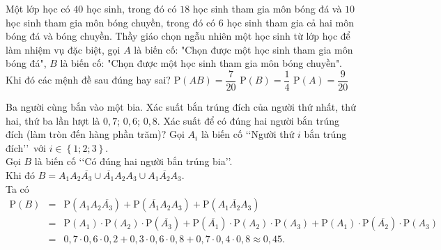 \begin{ex}%
	Một lớp học có $40$ học sinh, trong đó có $18$ học sinh tham gia môn bóng đá và $10$ học sinh tham gia môn bóng chuyền, trong đó có $6$ học sinh tham gia cả hai môn bóng đá và bóng chuyền. Thầy giáo chọn ngẫu nhiên một học sinh từ lớp học để làm nhiệm vụ đặc biệt, gọi $A$ là biến cố: "Chọn được một học sinh tham gia môn bóng đá", $B$ là biến cố: "Chọn được một học sinh tham gia môn bóng chuyền". Khi đó các mệnh đề sau đúng hay sai?
	{$\mathrm{P}(AB)=\dfrac{7}{20}$}
	{\True $\mathrm{P}(B)=\dfrac{1}{4}$}
	{\True $\mathrm{P}(A)=\dfrac{9}{20}$}
\end{ex}

\begin{ex}%
Ba người cùng bắn vào một bia. Xác suất bắn trúng đích của người thứ nhất, thứ hai, thứ ba lần lượt là $0,7$; $0,6$; $0,8$. Xác suất để có đúng hai người bắn trúng đích (làm tròn đến hàng phần trăm)?
\loigiai
{
Gọi $A_i$ là biến cố \lq\lq Người thứ $i$ bắn trúng đích\rq\rq\, với $i \in \left\{1;2;3\right\}$.\\
Gọi $B$ là biến cố \lq\lq Có đúng hai người bắn trúng bia\rq\rq.\\
Khi đó $B=A_1A_2\overline{A_3}\cup \overline{A_1}A_2A_3\cup A_1\overline{A_2}A_3$.\\
Ta có 
\begin{eqnarray*}
\mathrm{P} \left(B \right) &=& \mathrm{P} \left(A_1A_2\overline{A_3} \right)+\mathrm{P} \left(\overline{A_1}A_2A_3 \right)+\mathrm{P} \left(A_1\overline{A_2}A_3 \right) \\ 
& = & \mathrm{P} \left(A_1 \right) \cdot \mathrm{P} \left(A_2 \right)\cdot \mathrm{P} \left(\overline{A_3} \right)+\mathrm{P} \left(\overline{A_1} \right)\cdot \mathrm{P} \left(A_2 \right)\cdot \mathrm{P} \left(A_3 \right)+\mathrm{P} \left(A_1 \right)\cdot \mathrm{P} \left(\overline{A_2} \right) \cdot \mathrm{P} \left(A_3 \right) \\ 
& = & 0,7 \cdot 0,6 \cdot 0,2+0,3 \cdot 0,6 \cdot 0,8+0,7 \cdot 0,4 \cdot 0,8 \approx 0,45.
\end{eqnarray*}
}
\end{ex}

